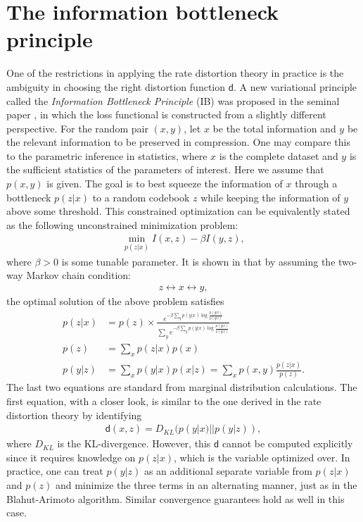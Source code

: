 \documentclass[10pt,a4paper]{amsart}
\numberwithin{equation}{section}
\theoremstyle{plain}
\theoremstyle{definition}
\begin{document}
\section{The information bottleneck principle}


One of the restrictions in applying the rate distortion theory in practice is the ambiguity in choosing the right distortion function $\mathsf d$. A new variational principle called the \emph{Information Bottleneck Principle} (IB) was proposed in the seminal paper \cite{slonim2000agglomerative}, in which the loss functional is constructed from a slightly different perspective. For the random pair $(x, y)$, let $x$ be the total information and $y$ be the relevant information to be preserved in compression. One may compare this to the parametric inference in statistics, where $x$ is the complete dataset and $y$ is the sufficient statistics of the parameters of interest. Here we assume that $p(x,y)$ is given. The goal is to best squeeze the information of $x$ through a bottleneck $p(z|x)$ to a random codebook $z$ while keeping the information of $y$ above some threshold. This constrained optimization can be equivalently stated as the following unconstrained minimization problem:
\begin{align}
\min_{p(z|x)} I(x,z)-\beta I(y,z),\label{2}
\end{align}
where $\beta>0$ is some tunable parameter. It is shown in \cite{slonim2000agglomerative} that by assuming the two-way Markov chain condition: 
\begin{align*}
z\leftrightarrow x\leftrightarrow y, 
\end{align*}
the optimal solution of the above problem satisfies
\begin{align*}
p(z|x) &= p(z)\times\frac{e^{-\beta\sum_{y}p(y|x)\log\frac{p(y|x)}{p(y|z)}}}{\sum_ye^{-\beta\sum_{y}p(y|x)\log\frac{p(y|x)}{p(y|z)}}}\\
p(z) &=\sum_{x}p(z|x)p(x)\\
p(y|z) & = \sum_x p(y|x)p(x|z) = \sum_x p(x, y)\frac{p(z|x)}{p(z)}.  
\end{align*}
The last two equations are standard from marginal distribution calculations. The first equation, with a closer look, is similar to the one derived in the rate distortion theory by identifying 
\begin{align*}
\mathsf d(x, z) = D_{KL}(p(y|x)||p(y|z)),
\end{align*} 
where $D_{KL}$ is the KL-divergence. However, this $\mathsf d$ cannot be computed explicitly since it requires knowledge on $p(z|x)$, which is the variable optimized over.  In practice, one can treat $p(y|z)$ as an additional separate variable from $p(z|x)$ and $p(z)$ and minimize the three terms in an alternating manner, just as in the Blahut-Arimoto algorithm. Similar convergence guarantees hold as well in this case. 
\end{document}
